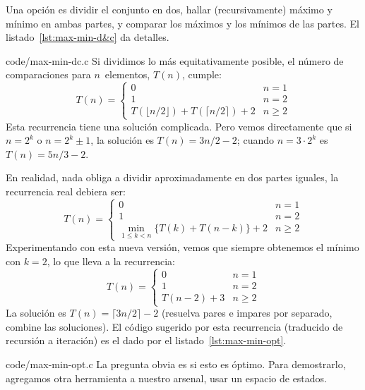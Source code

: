   Una opción es dividir el conjunto en dos,
  hallar (recursivamente) máximo y mínimo en ambas partes,
  y comparar los máximos y los mínimos de las partes.
  El listado~\ref{lst:max-min-d&c} da detalles.
  
                   {code/max-min-dc.c}
  Si dividimos lo más equitativamente posible,
  el número de comparaciones para \(n\)~elementos,
  \(T(n)\),
  cumple:
  \begin{equation}
    \label{eq:max-min-recursion-1}
    T(n)
      = \begin{cases}
          0							& n = 1	  \\
          1							& n = 2	  \\
          T(\lfloor n / 2 \rfloor) + T(\lceil n / 2 \rceil) + 2 & n \ge 2
        \end{cases}
  \end{equation}
  Esta recurrencia tiene una solución complicada.
  Pero vemos directamente que si \(n = 2^k\) o \(n = 2^k \pm 1\),
  la solución es \(T(n) = 3 n / 2 - 2\);
  cuando \(n = 3 \cdot 2^k\) es \(T(n) = 5 n / 3 - 2\).

  En realidad,
  nada obliga a dividir aproximadamente en dos partes iguales,
  la recurrencia real debiera ser:
  \begin{equation}
    \label{eq:max-min-recursion-2}
    T(n)
      = \begin{cases}
          0							& n = 1	  \\
          1							& n = 2	  \\
          \min_{1 \le k < n} \{ T(k) + T(n - k) \} + 2		& n \ge 2
        \end{cases}
  \end{equation}
  Experimentando con esta nueva versión,
  vemos que siempre obtenemos el mínimo con \(k = 2\),
  lo que lleva a la recurrencia:
  \begin{equation}
    \label{eq:max-min-recursion}
    T(n)
      = \begin{cases}
          0			& n = 1	  \\
          1			& n = 2	  \\
          T(n - 2) + 3		& n \ge 2
        \end{cases}
  \end{equation}
  La solución es \(T(n) = \lceil 3 n / 2 \rceil - 2\)
  (resuelva pares e impares por separado,
   combine las soluciones).
  El código sugerido por esta recurrencia
  (traducido de recursión a iteración)
  es el dado por el listado~\ref{lst:max-min-opt}.
  
                   {code/max-min-opt.c}
  La pregunta obvia es si esto es óptimo.
  Para demostrarlo,
  agregamos otra herramienta a nuestro arsenal,
  usar un espacio de estados.


